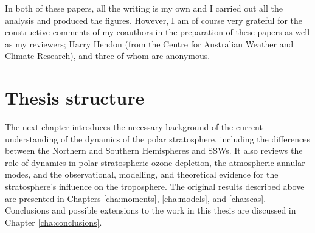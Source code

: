 In both of these papers, all the writing is my own and I carried out all the
analysis and produced the figures. However, I am of course very grateful for the
constructive comments of my coauthors in the preparation of these papers as well
as my reviewers; Harry Hendon (from the Centre for Australian Weather and
Climate Research), and three of whom are anonymous.

\section{Thesis structure}

The next chapter introduces the necessary background of the current
understanding of the dynamics of the polar stratosphere, including the
differences between the Northern and Southern Hemispheres and SSWs. It also
reviews the role of dynamics in polar stratospheric ozone depletion, the
atmospheric annular modes, and the observational, modelling, and theoretical
evidence for the stratosphere's influence on the troposphere. The original
results described above are presented in Chapters \ref{cha:moments},
\ref{cha:models}, and \ref{cha:seas}. Conclusions and possible extensions to
the work in this thesis are discussed in Chapter \ref{cha:conclusions}. 










